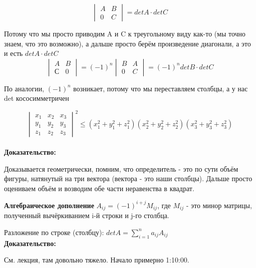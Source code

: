 \documentclass[12pt]{article}
\begin{document}
\begin{remarkbox}
    \[
    \begin{vmatrix}
        A & B\\
        0 & C
    \end{vmatrix}
    = detA \cdot detC\]

    Потому что мы просто приводим A и C к треугольному виду как-то (мы точно знаем, что это возможно), а дальше просто берём произведение диагонали, а это и есть $detA \cdot detC$\\

    \[
    \begin{vmatrix}
        A & B\\
        С & 0
    \end{vmatrix}
    = (-1)^n
    \begin{vmatrix}
        B & A\\
        0 & C
    \end{vmatrix}
    = (-1)^n detB \cdot detC\]

    По аналогии, $(-1)^n$ возникает, потому что мы переставляем столбцы, а у нас det кососимметричен
\end{remarkbox}

\begin{theorembox}
    \[
    \begin{vmatrix}
        x_1 & x_2 & x_3\\
        y_1 & y_2 & y_3\\
        z_1 & z_2 & z_3
    \end{vmatrix}^2
    \leq (x_1^2 + y_1^2 + z_1^2)(x_2^2 + y_2^2 + z_2^2)(x_3^2 + y_3^2 + z_3^2)\]\\

    \textbf{Доказательство:}

    Доказывается геометрически, помним, что определитель - это по сути объём фигуры, натянутый на три вектора (вектора - это наши столбцы). Дальше просто оцениваем объём и возводим обе части неравенства в квадрат.
\end{theorembox}

\begin{definitionbox}
    \textbf{Алгебраическое дополнение} $A_{ij} = (-1)^{i + j} M_{ij}$, где $ M_{ij}$ - это минор матрицы, полученный вычёркиванием i-й строки и j-го столбца.
\end{definitionbox}

\begin{theorembox}
    Разложение по строке (столбцу): $detA = \sum_{i = 1}^n a_{ij} A_{ij}$\\

    \textbf{Доказательство:}
    
    См. лекция, там довольно тяжело. Начало примерно 1:10:00.
    
\end{theorembox}
\end{document}
